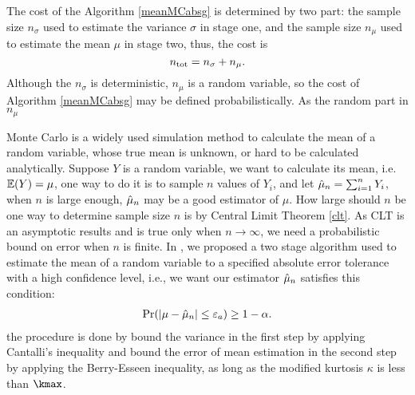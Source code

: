 \documentclass{iitthesis}
\begin{document}
The cost of the Algorithm \ref{meanMCabsg} is determined by two part: the sample size $n_{\sigma}$ used to estimate the variance $\sigma$ in stage one, and the sample size $n_\mu$ used to estimate the mean $\mu$ in stage two, thus, the cost is 
$$n_{\rm tot} = n_\sigma+n_\mu.$$
Although the $n_\sigma$ is deterministic, $n_\mu$ is a random variable, so the cost of Algorithm \ref{meanMCabsg} may be defined probabilistically. As the random part in $n_\mu$







Monte Carlo is a widely used simulation method to calculate the mean of a random variable, whose true mean is unknown, or hard to be calculated analytically. Suppose $Y$ is a random variable, we want to calculate its mean, i.e. $\mathbb{E}(Y) = \mu$, one way to do it is to sample $n$ values of $Y_i$, and let $\hat{\mu}_n = \sum_{i=1}^n Y_i$, when $n$ is large enough, $\hat{\mu}_n$ may be a good estimator of $\mu$. 
How large should $n$ be one way to determine sample size $n$ is by Central Limit Theorem \ref{clt}. As CLT is an asymptotic results and is true only when $n \to \infty$, we need a probabilistic bound on error when $n$ is finite. In \cite{HJLO12}, we proposed a two stage algorithm used to estimate the mean of a random variable to a specified absolute error tolerance with a high confidence level, i.e., we want our estimator $\hat{\mu}_n$ satisfies this condition:
\begin{align}\label{absCI}
\Pr(\left \lvert \mu-\hat{\mu}_n \right \rvert \leq \varepsilon_a) \geq 1-\alpha.
\end{align} 
the procedure is done by bound the variance in the first step by applying Cantalli's inequality and bound the error of mean estimation in the second step by applying the Berry-Esseen inequality, as long as the modified kurtosis $\kappa$ is less than $\kmax$.
\end{document}
